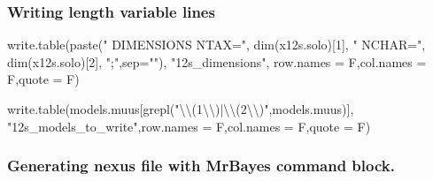\documentclass[
]{article}
\newenvironment{Shaded}{\begin{snugshade}}{\end{snugshade}}
\newcommand{\AttributeTok}[1]{\textcolor[rgb]{0.77,0.63,0.00}{#1}}
\newcommand{\DecValTok}[1]{\textcolor[rgb]{0.00,0.00,0.81}{#1}}
\newcommand{\FunctionTok}[1]{\textcolor[rgb]{0.00,0.00,0.00}{#1}}
\newcommand{\NormalTok}[1]{#1}
\newcommand{\SpecialCharTok}[1]{\textcolor[rgb]{0.00,0.00,0.00}{#1}}
\newcommand{\StringTok}[1]{\textcolor[rgb]{0.31,0.60,0.02}{#1}}
\begin{document}
\hypertarget{writing-length-variable-lines}{%
\subsubsection{Writing length variable
lines}\label{writing-length-variable-lines}}

\begin{Shaded}
\begin{Highlighting}[]
\FunctionTok{write.table}\NormalTok{(}\FunctionTok{paste}\NormalTok{(}\StringTok{"  DIMENSIONS NTAX="}\NormalTok{,}
                  \FunctionTok{dim}\NormalTok{(x12s.solo)[}\DecValTok{1}\NormalTok{],}
                  \StringTok{" NCHAR="}\NormalTok{,}
                  \FunctionTok{dim}\NormalTok{(x12s.solo)[}\DecValTok{2}\NormalTok{],}
                  \StringTok{";"}\NormalTok{,}\AttributeTok{sep=}\StringTok{""}\NormalTok{),}
            \StringTok{"12s\_dimensions"}\NormalTok{,}
            \AttributeTok{row.names =}\NormalTok{ F,}\AttributeTok{col.names =}\NormalTok{ F,}\AttributeTok{quote =}\NormalTok{ F)}

\FunctionTok{write.table}\NormalTok{(models.muus[}\FunctionTok{grepl}\NormalTok{(}\StringTok{"}\SpecialCharTok{\textbackslash{}\textbackslash{}}\StringTok{(1}\SpecialCharTok{\textbackslash{}\textbackslash{}}\StringTok{)|}\SpecialCharTok{\textbackslash{}\textbackslash{}}\StringTok{(2}\SpecialCharTok{\textbackslash{}\textbackslash{}}\StringTok{)"}\NormalTok{,models.muus)],}
            \StringTok{"12s\_models\_to\_write"}\NormalTok{,}\AttributeTok{row.names =}\NormalTok{ F,}\AttributeTok{col.names =}\NormalTok{ F,}\AttributeTok{quote =}\NormalTok{ F)}
\end{Highlighting}
\end{Shaded}

\hypertarget{generating-nexus-file-with-mrbayes-command-block.-1}{%
\subsubsection{Generating nexus file with MrBayes command
block.}\label{generating-nexus-file-with-mrbayes-command-block.-1}}
\end{document}

